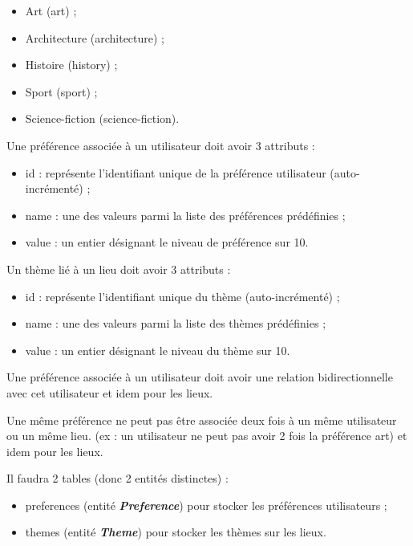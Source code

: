 \documentclass[big]{zmdocument}
\begin{document}
\begin{itemize}
\item Art (art) ;
\item Architecture (architecture) ;
\item Histoire (history) ;
\item Sport (sport) ;
\item Science-fiction (science-fiction).
\end{itemize}


Une préférence associée à un utilisateur doit avoir 3 attributs :



\begin{itemize}
\item id : représente l'identifiant unique de la préférence utilisateur (auto-incrémenté) ;
\item name : une des valeurs parmi la liste des préférences prédéfinies ;
\item value : un entier désignant le niveau de préférence sur 10.
\end{itemize}


Un thème lié à un lieu doit avoir 3 attributs :



\begin{itemize}
\item id : représente l'identifiant unique du thème (auto-incrémenté) ;
\item name : une des valeurs parmi la liste des thèmes prédéfinies ;
\item value : un entier désignant le niveau du thème sur 10.
\end{itemize}


Une préférence associée à un utilisateur doit avoir une relation bidirectionnelle avec cet utilisateur et idem pour les lieux.



Une même préférence ne peut pas être associée deux fois à un même utilisateur ou un même lieu. (ex : un utilisateur ne peut pas avoir 2 fois la préférence art) et idem pour les lieux.



Il faudra 2 tables (donc 2 entités distinctes) :



\begin{itemize}
\item preferences (entité \textbf{\textit{Preference}}) pour stocker les préférences utilisateurs ;
\item themes (entité \textbf{\textit{Theme}}) pour stocker les thèmes sur les lieux.
\end{itemize}
\end{document}
